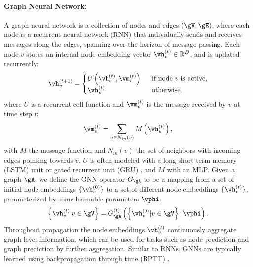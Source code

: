 \documentclass{article} %
\begin{document}
\paragraph{Graph Neural Network:}
A graph neural network \citep{ScarselliGTHM09,li2015gated,KipfW16} is a collection of nodes and
edges $(\gV, \gE)$, where each node is a recurrent neural network (RNN) that individually sends and
receives messages along the edges, spanning over the horizon of message passing. Each node $v$
stores an internal node embedding vector $\vh_v^{(t)} \in \mathbb{R}^D$, and is updated recurrently:
\begin{equation}
\label{eq:gnn_prop}
\vh_v^{(t+1)} = 
\begin{cases}
U \left(\vh_v^{(t)}, \vm_v^{(t)} \right) \ \ & \text{if node $v$ is active},\\
\vh_v^{(t)} \ \ & \text{otherwise},
\end{cases}
\end{equation}
where $U$ is a recurrent cell function and $\vm_v^{(t)}$ is the message received by $v$ at time step
$t$:
\begin{equation}
\vm_v^{(t)}=\sum_{u\in N_{in}(v)} M \left(\vh_u^{(t)} \right),
\end{equation}
with $M$ the message function and $N_{in}(v)$ the set of neighbors with incoming edges pointing
towards $v$. $U$ is often modeled with a long short-term memory (LSTM) unit \citep{hochreiter97lstm}
or gated recurrent unit (GRU) \citep{cho14gru}, and $M$ with an MLP. Given a graph $\gA$, we define
the GNN operator $G_\gA$ to be a mapping from a set of initial node embeddings $\{\vh_v^{(0)}\}$ to
a set of different node embeddings $\{\vh_v^{(t)}\}$, parameterized by some learnable parameters
$\vphi$:
\begin{equation}
\left\{\vh_v^{(t)} | v \in \gV\right\} = 
G_\gA^{(t)} \left(\left\{\vh_v^{(0)} | v \in \gV \right\}; \vphi \right).
\end{equation}
Throughout propagation the node embeddings $\vh_v^{(t)}$ continuously aggregate graph level
information, which  can be used for tasks such as node prediction and   graph prediction by further
aggregation. Similar to RNNs, GNNs are typically learned using backpropagation through time (BPTT)
\citep{bptt}.
\end{document}
